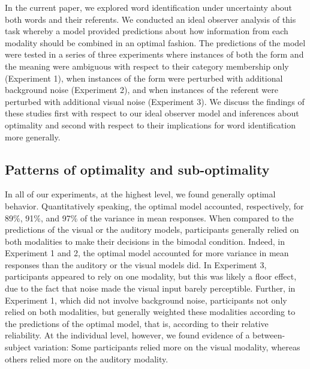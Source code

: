 \documentclass[english,floatsintext,man]{apa6}
\theoremstyle{definition}
\theoremstyle{definition}
\theoremstyle{definition}
\theoremstyle{remark}
\begin{document}
In the current paper, we explored word identification under uncertainty
about both words and their referents. We conducted an ideal observer
analysis of this task whereby a model provided predictions about how
information from each modality should be combined in an optimal fashion.
The predictions of the model were tested in a series of three
experiments where instances of both the form and the meaning were
ambiguous with respect to their category membership only (Experiment 1),
when instances of the form were perturbed with additional background
noise (Experiment 2), and when instances of the referent were perturbed
with additional visual noise (Experiment 3). We discuss the findings of
these studies first with respect to our ideal observer model and
inferences about optimality and second with respect to their
implications for word identification more generally.

\subsection{Patterns of optimality and
sub-optimality}\label{patterns-of-optimality-and-sub-optimality}

In all of our experiments, at the highest level, we found generally
optimal behavior. Quantitatively speaking, the optimal model accounted,
respectively, for 89\%, 91\%, and 97\% of the variance in mean
responses. When compared to the predictions of the visual or the
auditory models, participants generally relied on both modalities to
make their decisions in the bimodal condition. Indeed, in Experiment 1
and 2, the optimal model accounted for more variance in mean responses
than the auditory or the visual models did. In Experiment 3,
participants appeared to rely on one modality, but this was likely a
floor effect, due to the fact that noise made the visual input barely
perceptible. Further, in Experiment 1, which did not involve background
noise, participants not only relied on both modalities, but generally
weighted these modalities according to the predictions of the optimal
model, that is, according to their relative reliability. At the
individual level, however, we found evidence of a between-subject
variation: Some participants relied more on the visual modality, whereas
others relied more on the auditory modality.
\end{document}
